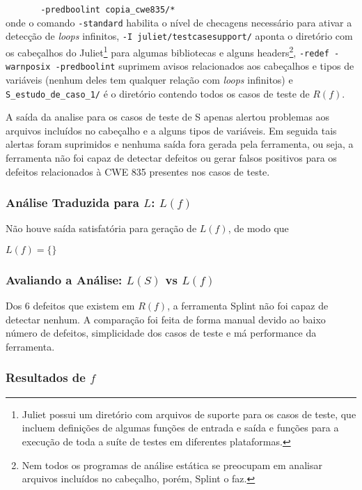 \lstinline{       -predboolint copia_cwe835/*}\\
onde o comando \lstinline{-standard} habilita o nível de checagens necessário para ativar a detecção de \textit{loops} infinitos, \lstinline{-I juliet/testcasesupport/} aponta o diretório com os cabeçalhos do Juliet\footnote{Juliet possui um diretório com arquivos de suporte para os casos de teste, que incluem definições de algumas funções de entrada e saída e funções para a execução de toda a suíte de testes em diferentes plataformas.} para algumas bibliotecas e alguns headers\footnote{Nem todos os programas de análise estática se preocupam em analisar arquivos incluídos no cabeçalho, porém, Splint o faz.}, \lstinline{-redef -warnposix -predboolint} suprimem avisos relacionados aos cabeçalhos e tipos de variáveis (nenhum deles tem qualquer relação com \textit{loops} infinitos) e \lstinline{S_estudo_de_caso_1/} é o diretório contendo todos os casos de teste de $R(f)$.

A saída da analise para os casos de teste de S apenas alertou problemas aos arquivos incluídos no cabeçalho e a alguns tipos de variáveis. Em seguida tais alertas foram suprimidos e nenhuma saída fora gerada pela ferramenta, ou seja, a ferramenta não foi capaz de detectar defeitos ou gerar falsos positivos para os defeitos relacionados à CWE 835 presentes nos casos de teste.

\subsubsection{Análise Traduzida para $L$: $L(f)$}

Não houve saída satisfatória para geração de $L(f)$, de modo que 

$L(f) = \lbrace\rbrace$

\subsubsection{Avaliando a Análise: $L(S)$ vs $L(f)$}

Dos 6 defeitos que existem em $R(f)$, a ferramenta Splint não foi capaz de detectar nenhum. A comparação foi feita de forma manual devido ao baixo número de defeitos, simplicidade dos casos de teste e má performance da ferramenta.

\subsubsection{Resultados de $f$}

